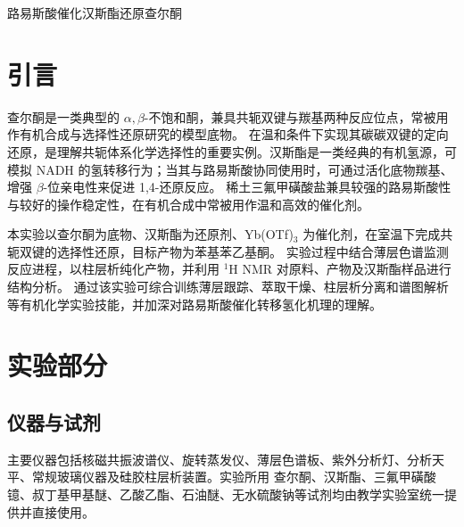 \documentclass[a4paper]{article}
\newcommand{\zihaoSan}{\fontsize{16pt}{24pt}\selectfont}
\newcommand{\zihaoWu}{\fontsize{10.5pt}{16pt}\selectfont}
\begin{document}
\zihaoWu

\begin{center}
	{\zihaoSan\heiti 路易斯酸催化汉斯酯还原查尔酮}
\end{center}

\vspace{6pt}

\section{引言}
\vspace{-0.5em}

查尔酮是一类典型的 $\alpha,\beta$-不饱和酮，兼具共轭双键与羰基两种反应位点，常被用作有机合成与选择性还原研究的模型底物。
在温和条件下实现其碳碳双键的定向还原，是理解共轭体系化学选择性的重要实例。汉斯酯是一类经典的有机氢源，可模拟
NADH 的氢转移行为；当其与路易斯酸协同使用时，可通过活化底物羰基、增强 $\beta$-位亲电性来促进 1,4-还原反应。
稀土三氟甲磺酸盐兼具较强的路易斯酸性与较好的操作稳定性，在有机合成中常被用作温和高效的催化剂。\cite{kobayashi2002}

本实验以查尔酮为底物、汉斯酯为还原剂、Yb(OTf)$_3$ 为催化剂，在室温下完成共轭双键的选择性还原，目标产物为苯基苯乙基酮。
实验过程中结合薄层色谱监测反应进程，以柱层析纯化产物，并利用 $^1$H NMR 对原料、产物及汉斯酯样品进行结构分析。
通过该实验可综合训练薄层跟踪、萃取干燥、柱层析分离和谱图解析等有机化学实验技能，并加深对路易斯酸催化转移氢化机理的理解。\cite{xing2017,march2013}

\section{实验部分}
\vspace{-0.5em}

\subsection{仪器与试剂}

主要仪器包括核磁共振波谱仪、旋转蒸发仪、薄层色谱板、紫外分析灯、分析天平、常规玻璃仪器及硅胶柱层析装置。实验所用
查尔酮、汉斯酯、三氟甲磺酸镱、叔丁基甲基醚、乙酸乙酯、石油醚、无水硫酸钠等试剂均由教学实验室统一提供并直接使用。
\end{document}
